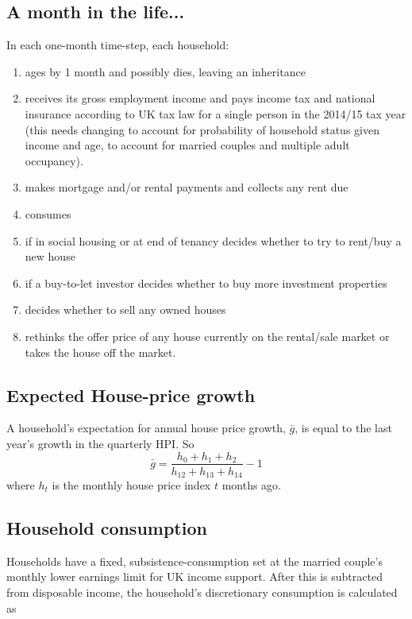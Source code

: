 \documentclass{report}
\begin{document}
\subsection{A month in the life...}
In each one-month time-step, each household:
\begin{enumerate}
\item ages by 1 month and possibly dies, leaving an inheritance
\item receives its gross employment income and pays income tax and national insurance according to UK tax law for a single person in the 2014/15 tax year (this needs changing to account for probability of household status given income and age, to account for married couples and multiple adult occupancy).
\item makes mortgage and/or rental payments and collects any rent due
\item consumes
\item if in social housing or at end of tenancy decides whether to try to rent/buy a new house
\item if a buy-to-let investor decides whether to buy more investment properties
\item decides whether to sell any owned houses
\item rethinks the offer price of any house currently on the rental/sale market or takes the house off the market.
\end{enumerate}


\subsection{Expected House-price growth}
A household's expectation for annual house price growth, $\bar{g}$, is equal to the last year's growth in the quarterly HPI. So
\begin{equation}
\bar{g} = \frac{h_0 + h_{1} + h_{2}}{h_{12} + h_{13} + h_{14}} - 1
\end{equation}
where $h_t$ is the monthly house price index $t$ months ago.

\subsection{Household consumption}

Households have a fixed, subsistence-consumption set at the married couple's monthly lower earnings limit for UK income support. After this is subtracted from disposable income, the household's discretionary consumption is calculated as
\end{document}

